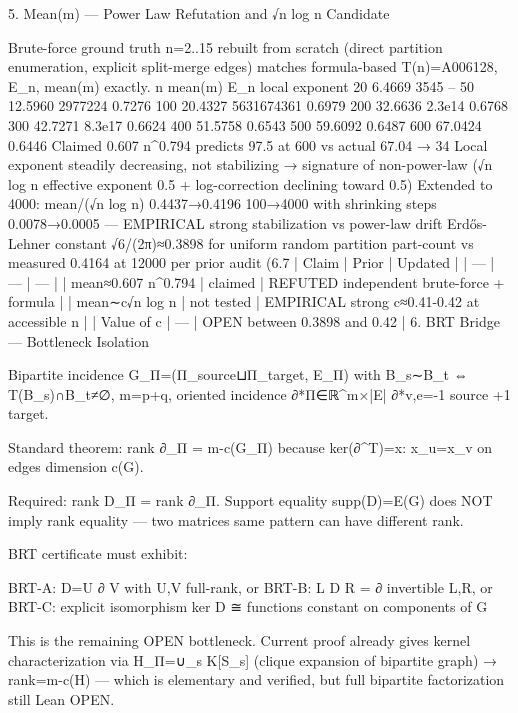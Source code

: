 5. Mean(m) — Power Law Refutation and √n log n Candidate

Brute-force ground truth n=2..15 rebuilt from scratch (direct partition enumeration, explicit split-merge edges) matches formula-based T(n)=A006128, E_n, mean(m) exactly.
n  mean(m)  E_n          local exponent
20 6.4669   3545         --
50 12.5960  2977224      0.7276
100 20.4327 5631674361   0.6979
200 32.6636 2.3e14       0.6768
300 42.7271 8.3e17       0.6624
400 51.5758              0.6543
500 59.6092              0.6487
600 67.0424              0.6446
Claimed 0.607 n^0.794 predicts 97.5 at 600 vs actual 67.04 → 34%
Local exponent steadily decreasing, not stabilizing → signature of non-power-law (√n log n effective exponent 0.5 + log-correction declining toward 0.5)
Extended to 4000: mean/(√n log n) 0.4437→0.4196 100→4000 with shrinking steps 0.0078→0.0005 — EMPIRICAL strong stabilization vs power-law drift
Erdős-Lehner constant √6/(2π)≈0.3898 for uniform random partition part-count vs measured 0.4164 at 12000 per prior audit (6.7%
| Claim | Prior | Updated |
| --- | --- | --- |
| mean≈0.607 n^0.794 | claimed | REFUTED independent brute-force + formula |
| mean∼c√n log n | not tested | EMPIRICAL strong c≈0.41-0.42 at accessible n |
| Value of c | — | OPEN between 0.3898 and 0.42 |
6. BRT Bridge — Bottleneck Isolation

Bipartite incidence G_Π=(Π_source⊔Π_target, E_Π) with B_s∼B_t ⇔ T(B_s)∩B_t≠∅, m=p+q, oriented incidence ∂*Π∈ℝ^{m×|E|} ∂*{v,e}=-1 source +1 target.

Standard theorem: rank ∂_Π = m-c(G_Π) because ker(∂^T)={x: x_u=x_v on edges} dimension c(G).

Required: rank D_Π = rank ∂_Π. Support equality supp(D)=E(G) does NOT imply rank equality — two matrices same pattern can have different rank.

BRT certificate must exhibit:

BRT-A: D=U ∂ V with U,V full-rank, or
BRT-B: L D R = ∂ invertible L,R, or
BRT-C: explicit isomorphism ker D ≅ {functions constant on components of G}

This is the remaining OPEN bottleneck. Current proof already gives kernel characterization via H_Π=∪_s K[S_s] (clique expansion of bipartite graph) → rank=m-c(H) — which is elementary and verified, but full bipartite factorization still Lean OPEN.

